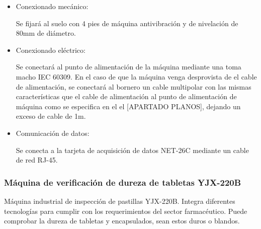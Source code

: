 		\begin{itemize}
				\item{Conexionado mecánico:}
				
				Se fijará al suelo con 4 pies de máquina antivibración y de nivelación de 80mm de diámetro.

				\item{Conexionado eléctrico:}

				Se conectará al punto de alimentación de la máquina mediante una  toma macho IEC 60309. En el caso de que la máquina venga desprovista de el cable de alimentación, se conectará al bornero un cable multipolar con las mismas características que el cable de alimentación al punto de alimentación de máquina como se especifica en el el [APARTADO PLANOS], dejando un exceso de cable de 1m. \
								
				\item{Comunicación de datos:}

				Se conecta a la tarjeta de acquisición de datos NET-26C mediante un cable de red RJ-45.
		\end{itemize}

	\newpage

	\subsubsection{Máquina de verificación de dureza de tabletas YJX-220B}

		
	Máquina industrial de inspección de pastillas YJX-220B. Integra diferentes tecnologías para cumplir con los requerimientos del sector farmacéutico. Puede comprobar la dureza de tabletas y encapsulados, sean estos duros o blandos.\\

